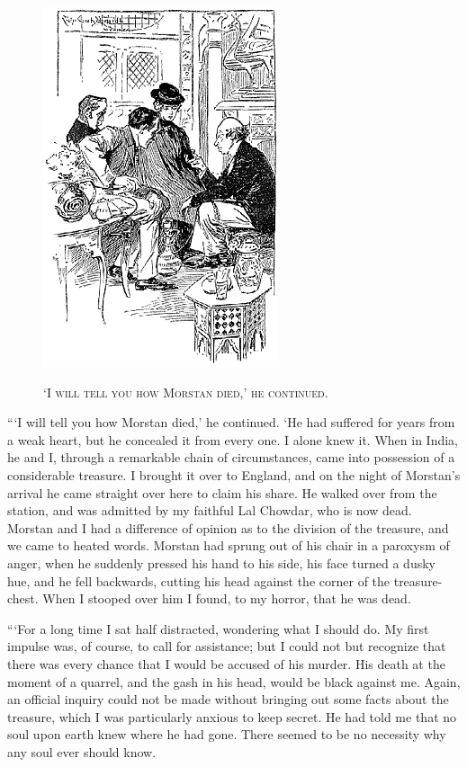 \documentclass[12pt,english,oneside]{book}
\newcommand{\noun}[1]{\textsc{#1}}
\begin{document}
%
\begin{figure}[htbp]
\noindent \begin{center}\includegraphics{images/sign410-sign-05.png}\end{center}

\noindent \begin{center}\noun{`I will tell you how Morstan died,'
he continued.}\end{center}
\end{figure}
{}```I will tell you how Morstan died,' he continued. `He had suffered
for years from a weak heart, but he concealed it from every one. I
alone knew it. When in India, he and I, through a remarkable chain
of circumstances, came into possession of a considerable treasure.
I brought it over to England, and on the night of Morstan's arrival
he came straight over here to claim his share. He walked over from
the station, and was admitted by my faithful Lal Chowdar, who is now
dead. Morstan and I had a difference of opinion as to the division
of the treasure, and we came to heated words. Morstan had sprung out
of his chair in a paroxysm of anger, when he suddenly pressed his
hand to his side, his face turned a dusky hue, and he fell backwards,
cutting his head against the corner of the treasure-chest. When I
stooped over him I found, to my horror, that he was dead.

{}```For a long time I sat half distracted, wondering what I should
do. My first impulse was, of course, to call for assistance; but I
could not but recognize that there was every chance that I would be
accused of his murder. His death at the moment of a quarrel, and the
gash in his head, would be black against me. Again, an official inquiry
could not be made without bringing out some facts about the treasure,
which I was particularly anxious to keep secret. He had told me that
no soul upon earth knew where he had gone. There seemed to be no necessity
why any soul ever should know.
\end{document}
